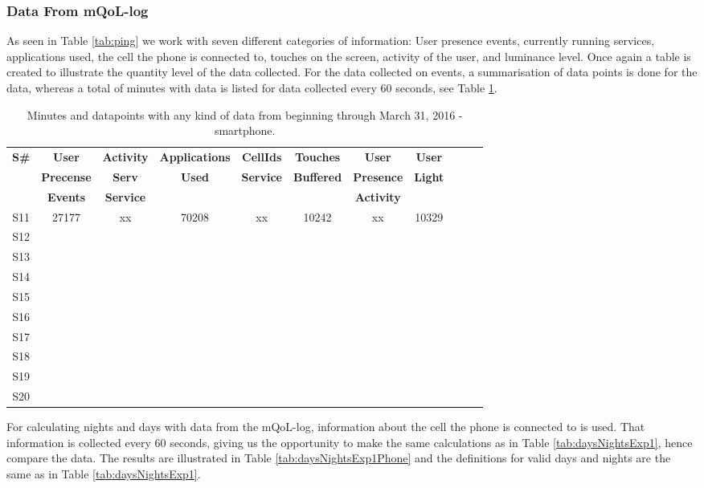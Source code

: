 \documentclass[12pt]{article} %
\begin{document}
\newpage
\subsubsection{Data From mQoL-log}
As seen in Table \ref{tab:ping} we work with seven different categories of information: User presence events, currently running services, applications used, the cell the phone is connected to, touches on the screen, activity of the user, and luminance level. Once again a table is created to illustrate the quantity level of the data collected. For the data collected on events, a summarisation of data points is done for the data, whereas a total of minutes with data is listed for data collected every 60 seconds, see Table \ref{tab:totalMinutesPhone}. 

\begin{table}[H]
\center
\begin{footnotesize}
	\begin{tabular}{| c || c | c | c | c | c | c | c | c | c | c |}
	\hline
	\textbf{S\#} & \textbf{User} & \textbf{Activity} & \textbf{Applications} & \textbf{CellIds} & \textbf{Touches} & \textbf{User} & \textbf{User}\\
	
	& \textbf{Precense} & \textbf{Serv} & \textbf{Used} & \textbf{Service} & \textbf{Buffered} & \textbf{Presence} &\textbf{Light} \\
	
	& \textbf{Events} & \textbf{Service} & & & & \textbf{Activity} & \\
	\hline
	S11 & 27177 & xx & 70208 & xx & 10242 & xx & 10329\\
	S12 & & & & & & &\\
	S13 & & & & & & &\\
	S14 & & & & & & &\\
	S15 & & & & & & &\\
	S16 & & & & & & &\\
	S17 & & & & & & &\\
	S18 & & & & & & &\\
	S19 & & & & & & &\\
	S20 & & & & & & &\\
	\hline
	\end{tabular}
	\caption{Minutes and datapoints with any kind of data from beginning through March 31, 2016 - smartphone.}
	\label{tab:totalMinutesPhone}
\end{footnotesize}
\end{table}

For calculating nights and days with data from the mQoL-log, information about the cell the phone is connected to is used. That information is collected every 60 seconds, giving us the opportunity to make the same calculations as in Table \ref{tab:daysNightsExp1}, hence compare the data. The results are illustrated in Table \ref{tab:daysNightsExp1Phone} and the definitions for valid days and nights are the same as in Table \ref{tab:daysNightsExp1}.
\end{document}
